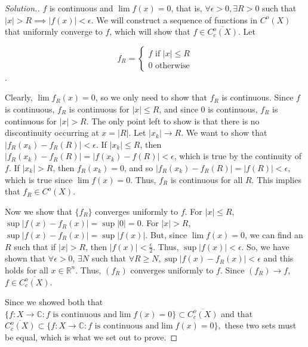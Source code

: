 \documentclass{article}
\newcommand{\R}{\mathbb{R}}
\newcommand{\C}{\mathbb{C}}
\newcommand{\sk}{\smallskip}
\begin{document}
\begin{enumerate}
\begin{proof}[Solution.]
        $f$ is continuous and $\lim f(x) = 0$, that is, $\forall \epsilon > 0, \exists R > 0$ such that $|x| > R \implies |f(x)| < \epsilon$. We will construct a sequence of functions in $C^o(X)$ that uniformly converge to $f$, which will show that $f \in \overline{C^o_c(X)}$. Let


        $$f_R = \begin{cases}
            f \text{ if } |x| \leq R \\
            0 \text{ otherwise} 
        \end{cases}$$.

        Clearly, $\lim f_R(x) = 0$, so we only need to show that $f_R$ is continuous. Since $f$ is continuous, $f_R$ is continuous for $|x| \leq R$, and since $0$ is continuous, $f_R$ is continuous for $|x| > R$. The only point left to show is that there is no discontinuity occurring at $x = |R|$. Let $|x_k| \rightarrow R$. We want to show that $|f_R(x_k) - f_R(R)| < \epsilon$. If $|x_k| \leq R$, then $|f_R(x_k) - f_R(R)| = |f(x_k) - f(R)| < \epsilon$, which is true by the continuity of $f$. If $|x_k| > R$, then $f_R(x_k) = 0$, and so $|f_R(x_k) - f_R(R)| = |f(R)| < \epsilon$, which is true since $\lim f(x) = 0$. Thus, $f_R$ is continuous for all $R$. This implies that $f_R \in C^o(X)$. 

        \sk

        Now we show that $\{f_R\}$ converges uniformly to $f$. For $|x| \leq R$, $\sup |f(x) - f_R(x)| = \sup |0| = 0$. For $|x| > R$, $\sup |f(x) - f_R(x)| = \sup |f(x)|$. But, since $\lim f(x) = 0$, we can find an $R$ such that if $|x| > R$, then $|f(x)| < \frac{\epsilon}{2}$. Thus, $\sup |f(x)| < \epsilon$. So, we have shown that $\forall \epsilon > 0$, $\exists N$ such that $\forall R \geq N, \sup |f(x) - f_R(x)| < \epsilon$ and this holds for all  $x \in \R^n$. Thus, $(f_R)$ converges uniformly to $f$. Since $(f_R) \rightarrow f$, $f \in \overline{C^o_c(X)}$. 

        \sk

        Since we showed both that $\{f: X \rightarrow \C : f \text{ is continuous and} \lim f(x) = 0\} \subset \overline{C^o_c(X)}$ and that $\overline{C^o_c(X)} \subset \{f: X \rightarrow \C : f \text{ is continuous and} \lim f(x) = 0\},$ these two sets must be equal, which is what we set out to prove.
    \end{proof}
\end{enumerate}
\end{document}
